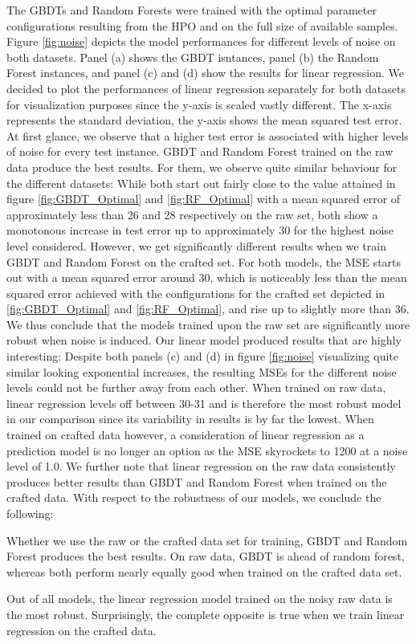 The GBDTs and Random Forests were trained with the optimal parameter configurations resulting from the HPO and on the full size of available samples. Figure \ref{fig:noise} depicts the model performances for different levels of noise on both datasets. Panel (a) shows the GBDT isntances, panel (b) the Random Forest instances, and panel (c) and (d) show the results for linear regression. We decided to plot the performances of linear regression separately for both datasets for visualization purposes since the y-axis is scaled vastly different. The x-axis represents the standard deviation, the y-axis shows the mean squared test error. At first glance, we observe that a higher test error is associated with higher levels of noise for every test instance. GBDT and Random Forest trained on the raw data produce the best results. For them, we observe quite similar behaviour for the different datasets: While both start out fairly close to the value attained in figure \ref{fig:GBDT_Optimal} and \ref{fig:RF_Optimal} with a mean squared error of approximately less than 26 and 28 respectively on the raw set, both show a monotonous increase in test error up to approximately 30 for the highest noise level considered. However, we get significantly different results when we train GBDT and Random Forest on the crafted set. For both models, the MSE starts out with a mean squared error around 30, which is noticeably less than the mean squared error achieved with the configurations for the crafted set depicted in \ref{fig:GBDT_Optimal} and \ref{fig:RF_Optimal}, and rise up to slightly more than 36. We thus conclude that the models trained upon the raw set are significantly more robust when noise is induced. Our linear model produced results that are highly interesting: Despite both panels (c) and (d) in figure \ref{fig:noise} visualizing quite similar looking exponential increases, the resulting MSEs for the different noise levels could not be further away from each other. When trained on raw data, linear regression levels off between 30-31 and is therefore the most robust model in our comparison since its variability in results is by far the lowest. When trained on crafted data however, a consideration of linear regression as a prediction model is no longer an option as the MSE skyrockets to 1200 at a noise level of 1.0. We further note that linear regression on the raw data consistently produces better results than GBDT and Random Forest when trained on the crafted data. 
With respect to the robustness of our models, we conclude the following:
\begin{description}[font=$\bullet$\scshape\bfseries]
	\item Whether we use the raw or the crafted data set for training, GBDT and Random Forest produces the best results. On raw data, GBDT is ahead of random forest, whereas both perform nearly equally good when trained on the crafted data set. 
	\item Out of all models, the linear regression model trained on the noisy raw data is the most robust. Surprisingly, the complete opposite is true when we train linear regression on the crafted data. 
\end{description}
